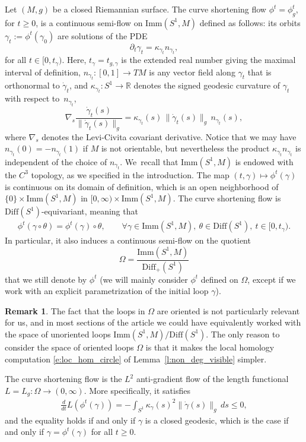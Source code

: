\documentclass[JEP,XML,SOM,Unicode,NoFloatCountersInSection,published]{cedram}
\newcommand{\R}{\mathbb{R}}
\newcommand{\Diff}{\mathrm{Diff}}
\newcommand{\Imm}{\mathrm{Imm}}
\theoremstyle{plain}
\theoremstyle{definition}
\newtheorem{Remark}[Thm]{Remark}
\begin{document}
Let $(M,g)$ be a closed Riemannian surface.
The curve shortening flow $\phi^t=\phi^t_g$, for $t\geq0$, is a continuous semi-flow on $\Imm(S^1,M)$ defined as follows: its orbits $\gamma_t:=\phi^t(\gamma_0)$ are solutions of the PDE
\[
\partial_t\gamma_t=\kappa_{\gamma_t}n_{\gamma_t},
\]
for all $t\in[0,t_\gamma)$. Here, $t_\gamma=t_{g,\gamma}$ is the extended real number giving the maximal interval of definition, $n_{\gamma_t}:[0,1]\to TM$ is any vector field along $\gamma_t$ that is orthonormal to $\dot\gamma_t$, and $\kappa_{\gamma_t}:S^1\to\R$ denotes the signed geodesic curvature of $\gamma_t$ with respect to~$n_{\gamma_t}$, \ie
\[
\nabla\!_s\frac{\dot\gamma_t(s)}{\|\dot\gamma_t(s)\|_g}
=
\kappa_{\gamma_t}(s)\,\|\dot\gamma_t(s)\|_g\,n_{\gamma_t}(s),
\]
where $\nabla_s$ denotes the Levi-Civita covariant derivative. Notice that we may have $n_{\gamma_t}(0)=-n_{\gamma_t}(1)$ if $M$ is not orientable, but nevertheless the product $\kappa_{\gamma_t} n_{\gamma_t}$ is independent of the choice of $n_{\gamma_t}$. We~recall that $\Imm(S^1,M)$ is endowed with the $C^3$ topology, as we specified in the introduction.
The map $(t,\gamma)\mapsto\phi^t(\gamma)$ is continuous on its domain of definition, which is an open neighborhood of $\{0\}\times\Imm(S^1,M)$ in $[0,\infty)\times\Imm(S^1,M)$.
The curve shortening flow is $\Diff(S^1)$-equivariant, meaning that
\begin{align*}
\phi^t(\gamma\circ\theta)
=
\phi^t(\gamma)\circ\theta,
\qquad\forall\gamma\in\Imm(S^1,M),\ \theta\in\Diff(S^1),\ t\in[0,t_\gamma).
\end{align*}
In particular, it also induces a continuous semi-flow on the quotient
\[
\Omega=\frac{\Imm(S^1,M)}{\Diff_+(S^1)}
\] that we still denote by $\phi^t$ (we will mainly consider $\phi^t$ defined on $\Omega$, except if we work with an explicit parametrization of the initial loop $\gamma$).

\begin{Remark}
The fact that the loops in $\Omega$ are oriented is not particularly relevant for us, and in most sections of the article we could have equivalently worked with the space of unoriented loops $\Imm(S^1,M)/\Diff(S^1)$. The only reason to consider the space of oriented loops $\Omega$ is that it makes the local homology computation \eqref{e:loc_hom_circle} of Lemma~\ref{l:non_deg_visible} simpler.
\end{Remark}

The curve shortening flow is the $L^2$ anti-gradient flow of the length functional $L=L_g:\Omega\to(0,\infty)$. More specifically, it satisfies
\begin{align}
\label{e:derivative_length}
\frac{d}{dt} L(\phi^t(\gamma))
=
-\int_{S^1} \kappa_\gamma(s)^2 \|\dot\gamma(s)\|_g\,ds
\leq0,
\end{align}
and the equality holds if and only if $\gamma$ is a closed geodesic, which is the case if and only if $\gamma=\phi^t(\gamma)$ for all $t\geq0$.
\end{document}
